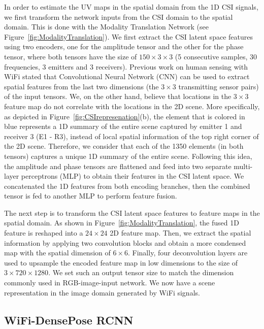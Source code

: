 \documentclass[sigconf, anonymous=false]{acmart}
\begin{document}
In order to estimate the UV maps in the spatial domain from the 1D CSI signals, we first transform the network inputs from the CSI domain to the spatial domain. This is done with the Modality Translation Network (see Figure~\ref{fig:ModalityTranslation}). We first extract the CSI latent space features using two encoders, one for the amplitude tensor and the other for the phase tensor, where both tensors have the size of $150 \times 3 \times 3$ (5 consecutive samples, 30 frequencies, 3 emitters and 3 receivers). Previous work on human sensing with WiFi \cite{Person-in-wifi} stated that Convolutional Neural Network (CNN) can be used to extract spatial features from the last 
two dimensions (the $3 \times 3$ transmitting sensor pairs) of the input tensors. We, on the other hand, believe that locations in the $3 \times 3$ feature map do not correlate with the locations in the 2D scene. More specifically, as depicted in Figure~\ref{fig:CSIrepresenation}(b), the element that is colored in blue represents a 1D summary of the entire scene captured by emitter 1 and receiver 3 (E1 - R3), instead of local spatial information of the top right corner of the 2D scene. Therefore, we consider that each of the 1350 elements (in both tensors) captures a unique 1D summary
of the entire scene. Following this idea, the amplitude and phase tensors are flattened and feed into two separate multi-layer perceptrons (MLP) to obtain their features in the CSI latent space. We concatenated the 1D features from both encoding branches, then the combined tensor is fed to another MLP to perform feature fusion. 

The next step is to transform the CSI latent space features to feature maps in the spatial domain. As shown in Figure~\ref{fig:ModalityTranslation}, the fused 1D feature is reshaped into a $24 \times 24$ 2D feature map. Then, we extract the spatial information by applying two convolution blocks and obtain a more condensed map with the spatial dimension of $6 \times 6$. Finally, four deconvolution layers are used to upsample the encoded feature map in low dimensions to the size of $3 \times 720 \times 1280$. We set such an output tensor size to match the dimension commonly used in RGB-image-input network. We now have a scene representation in the image domain generated by WiFi signals.



\subsection{WiFi-DensePose RCNN}
\end{document}
